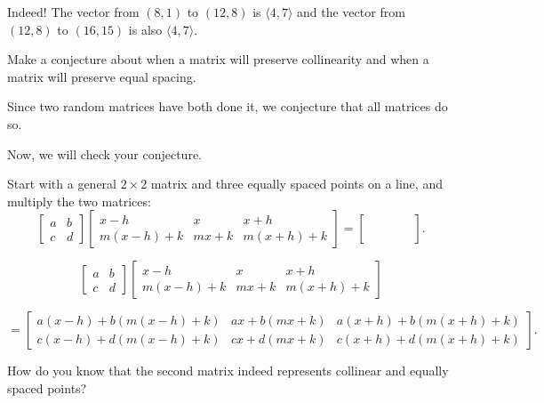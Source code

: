 \documentclass[../gatm_answers.tex]{subfiles}
\begin{document}
Indeed! The vector from $(8,1)$ to $(12,8)$ is $\langle 4, 7\rangle$ and the vector from $(12,8)$ to $(16,15)$ is also $\langle 4, 7\rangle$.

\begin{inner_problem}
\item Make a conjecture about when a matrix will preserve collinearity and when a matrix will preserve equal spacing.
\end{inner_problem}

Since two random matrices have both done it, we conjecture that all matrices do so.

\begin{outer_problem}
\item Now, we will check your conjecture.
\end{outer_problem}

\begin{inner_problem}[start=1]
\item Start with a general $2\times 2$ matrix and three equally spaced points on a line, and multiply the two matrices:
$$\left[\begin{array}{cc}a & b \\ c & d\end{array}\right]
\left[\begin{array}{ccc}x-h & x & x+h \\ m(x-h)+k & mx+k & m(x+h)+k\end{array}\right]=
\left[\begin{array}{ccc}\phantom{0} & \phantom{0} & \phantom{0} \\ \phantom{0} \end{array}\right].$$
\end{inner_problem}

$$\begin{bmatrix} a & b \\ c & d \end{bmatrix} \begin{bmatrix} x-h & x & x+h \\ m(x-h)+k & mx+k & m(x+h)+k \end{bmatrix}$$

$$ = \begin{bmatrix} a(x-h) + b(m(x-h)+k) & ax + b(mx+k) & a(x+h) + b(m(x+h)+k) \\ c(x-h)+d(m(x-h)+k) & cx + d(mx+k) & c(x+h) + d(m(x+h)+k) \end{bmatrix}.$$

\begin{inner_problem}
\item How do you know that the second matrix indeed represents collinear and equally spaced points?
\end{inner_problem}
\end{document}
